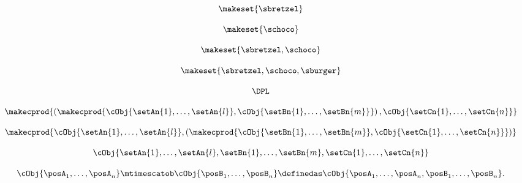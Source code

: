 {\begin{forslides}
    \begin{equation}
        \label{eq:parallelism-156}
        \makeset{ \sbretzel }
    \end{equation}

    \begin{equation}
        \label{eq:parallelism-157}
        \makeset{ \schoco }
    \end{equation}

    \begin{equation}
        \label{eq:parallelism-158}
        \makeset{ \sbretzel, \schoco }
    \end{equation}

    \begin{equation}
        \label{eq:parallelism-159}
        \makeset{ \sbretzel, \schoco, \sburger }
    \end{equation}

    \begin{equation}
        \label{eq:parallelism-160}
        \DPL
    \end{equation}

    \begin{equation}
    \label{eq:parallelism-161}
    \makecprod{
        \left ( \makecprod{\cObj{\setAn{1}, \ldots, \setAn{l}}, \cObj{\setBn{1}, \ldots, \setBn{m}}} \right )
        ,
        \cObj{\setCn{1}, \ldots, \setCn{n}}
    }
\end{equation}

    \begin{equation}
        \label{eq:parallelism-162}
            \makecprod{
        \cObj{\setAn{1}, \ldots, \setAn{l}},
        \left (
        \makecprod{
            \cObj{\setBn{1}, \ldots, \setBn{m}},
            \cObj{\setCn{1}, \ldots, \setCn{n}}
        }
        \right )
    }
    \end{equation}

    \begin{equation}
        \label{eq:parallelism-163}
            \cObj{\setAn{1}, \ldots, \setAn{l}, \setBn{1}, \ldots, \setBn{m}, \setCn{1}, \ldots, \setCn{n}}
    \end{equation}

    \begin{equation}
        \label{eq:parallelism-164}
         \cObj{\posA_1,\ldots, \posA_n} \mtimescatob \cObj{\posB_1,\ldots, \posB_n}  \definedas
        \cObj{\posA_1,\ldots, \posA_n, \posB_1,\ldots, \posB_n}.
    \end{equation}


\end{forslides}}
